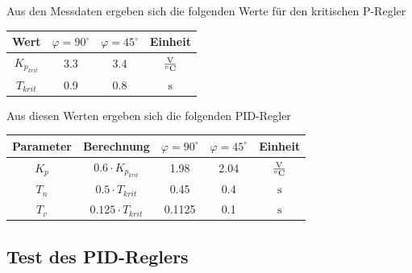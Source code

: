 Aus den Messdaten ergeben sich die folgenden Werte für den kritischen P-Regler
\begin{table}[h!]
	\centering
	\begin{tabular}{c c c c}
		Wert
			& $\varphi = 90^\circ$
			& $\varphi = 45^\circ$
			& Einheit \\
		\hline 
		$K_{p_{krit}}$
			& 3.3
			& 3.4
			& $\si[per-mode=fraction]{\volt\per\celsius}$ \\
		$T_{krit}$
			& 0.9
			& 0.8
			& $\si{\second}$
	\end{tabular}
\end{table}

Aus diesen Werten ergeben sich die folgenden PID-Regler 
\begin{table}[h!]
	\centering
	\begin{tabular}{c c c c c}
		Parameter
			& Berechnung
			& $\varphi = 90^\circ$
			& $\varphi = 45^\circ$
			& Einheit \\
		\hline
		$K_p$
			& $0.6 \cdot K_{p_{krit}}$
			& 1.98
			& 2.04
			& $\si[per-mode=fraction]{\volt\per\celsius}$ \\
		$T_n$
			& $0.5 \cdot T_{krit}$
			& 0.45
			& 0.4
			& $\si{\second}$ \\
		$T_v$
			& $0.125 \cdot T_{krit}$
			& 0.1125
			& 0.1
			& $\si{\second}$
	\end{tabular}
\end{table}

\subsection{Test des PID-Reglers}

